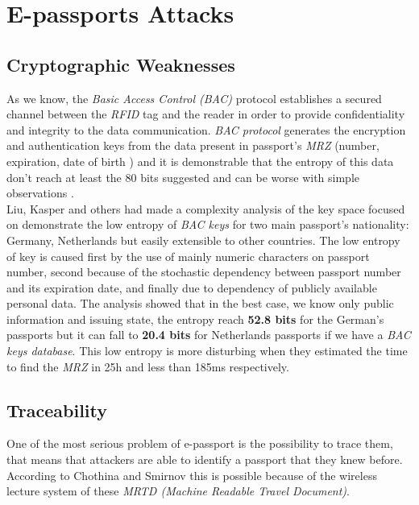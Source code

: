 \documentclass{acm_proc_article-sp}
\begin{document}
\section{E-passports Attacks}
\label{sec:sec3}

\subsection{Cryptographic Weaknesses}
\label{subsec:crypt}
As we know, the \textit{Basic Access Control (BAC)} protocol establishes a secured channel between 
the \textit{RFID} tag and the reader in order to provide confidentiality and integrity to the 
data communication. \textit{BAC protocol} generates the encryption and authentication keys from the data 
present in passport's \textit {MRZ} (number, expiration, date of birth ) and it is demonstrable 
that the entropy of this data don’t reach at least the 80 bits suggested and can be worse 
with simple observations \cite{JUAR2005} \cite{02COPA}.\\
Liu, Kasper and others \cite{02COPA} had made a complexity analysis of the key space focused on 
demonstrate the low entropy of \textit{BAC keys} for two main passport’s nationality: Germany, 
Netherlands but easily extensible to other countries. The low entropy of key is caused 
first by the use of mainly numeric characters on passport number, 
second because of the stochastic dependency between passport number and its expiration 
date, and finally due to dependency of publicly available personal data. The analysis 
showed that in the best case, we know only public information and issuing state, the 
entropy reach \textbf {52.8 bits} for the German’s passports but it can fall to \textbf {20.4 bits} for 
Netherlands passports if we have a \textit{BAC keys database}. This low entropy is more disturbing 
when they estimated the time to find the \textit{MRZ} in 25h and less than 185ms 
respectively.

\subsection{Traceability}
\label{subsec:trace}

One of the most serious problem of e-passport is the possibility to trace them, that means that  
attackers are able to identify a passport that they knew before. According to Chothina and Smirnov 
\cite{CHTOM2010} this is possible because of the wireless lecture system of these 
\textit{MRTD (Machine Readable Travel Document)}.
\end{document}

